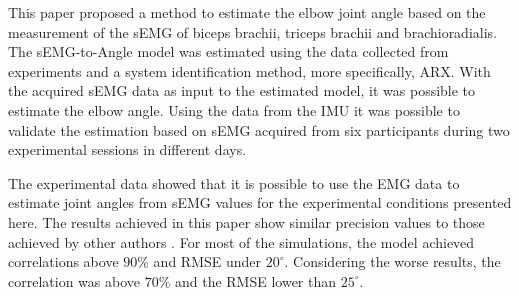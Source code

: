 \documentclass[letterpaper, 10 pt, conference]{ieeeconf}  %
\begin{document}
This paper proposed a method to estimate the elbow joint angle based on the measurement of the sEMG of biceps brachii, triceps brachii and brachioradialis. The sEMG-to-Angle model was estimated using the data collected from experiments and a system identification method, more specifically, ARX. With the acquired sEMG data as input to the estimated model, it was possible to estimate the elbow angle. Using the data from the IMU it was possible to validate the estimation based on sEMG acquired from six participants during two experimental sessions in different days.


The experimental data showed that it is possible to use the EMG data to estimate joint angles from sEMG values for the experimental conditions presented here. %
The results achieved in this paper show similar precision values to those achieved by other authors  \cite{Pang2015165,Liu1999391,Rahmatian2016158,Mamikoglu2016785}. For most of the simulations, the model achieved correlations above $90\%$ and RMSE under $20^\circ$. Considering the worse results, the correlation was above $70\%$ and the RMSE lower than $25^\circ$.



\end{document}
